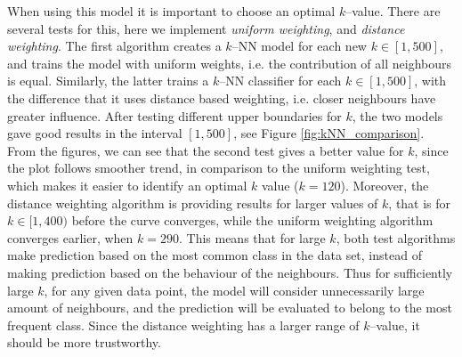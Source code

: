     When using this model it is important to choose an optimal $k$--value. There are several tests for this, here we implement \emph{uniform weighting}, and \emph{distance weighting}. The first algorithm creates a $k$--NN model for each new $k \in [1, 500]$, and trains the model with uniform weights, i.e. the contribution of all neighbours is equal. Similarly, the latter trains a $k$--NN classifier for each $k \in [1, 500]$, with the difference that it uses distance based weighting, i.e. closer neighbours have greater influence. After testing different upper boundaries for $k$, the two models gave good results in the interval $[1,500]$, see Figure \ref{fig:kNN_comparison}. From the figures, we can see that the second test gives a better value for $k$, since the plot follows smoother trend, in comparison to the uniform weighting test, which makes it easier to identify an optimal $k$ value ($k = 120$). Moreover, the distance weighting algorithm is providing results for larger values of $k$, that is for $k \in [1, 400)$ before the curve converges, while the uniform weighting algorithm converges earlier, when $k = 290$. This means that for large $k$, both test algorithms make prediction based on the most common class in the data set, instead of making prediction based on the behaviour of the neighbours. Thus for sufficiently large $k$, for any given data point, the model will consider unnecessarily large amount of neighbours, and the prediction will be evaluated to belong to the most frequent class. Since the distance weighting has a larger range of $k$--value, it should be more trustworthy.
    
